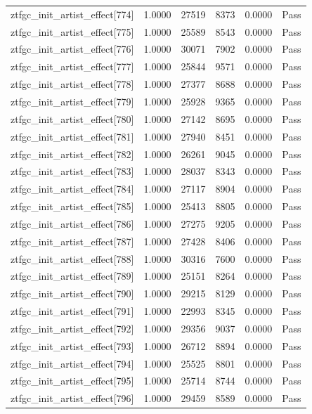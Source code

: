\begin{table}[htbp]
\begin{tabular}{llrrll}
ztfgc\_init\_artist\_effect[774] & 1.0000 & 27519 & 8373 & 0.0000 & Pass \\
ztfgc\_init\_artist\_effect[775] & 1.0000 & 25589 & 8543 & 0.0000 & Pass \\
ztfgc\_init\_artist\_effect[776] & 1.0000 & 30071 & 7902 & 0.0000 & Pass \\
ztfgc\_init\_artist\_effect[777] & 1.0000 & 25844 & 9571 & 0.0000 & Pass \\
ztfgc\_init\_artist\_effect[778] & 1.0000 & 27377 & 8688 & 0.0000 & Pass \\
ztfgc\_init\_artist\_effect[779] & 1.0000 & 25928 & 9365 & 0.0000 & Pass \\
ztfgc\_init\_artist\_effect[780] & 1.0000 & 27142 & 8695 & 0.0000 & Pass \\
ztfgc\_init\_artist\_effect[781] & 1.0000 & 27940 & 8451 & 0.0000 & Pass \\
ztfgc\_init\_artist\_effect[782] & 1.0000 & 26261 & 9045 & 0.0000 & Pass \\
ztfgc\_init\_artist\_effect[783] & 1.0000 & 28037 & 8343 & 0.0000 & Pass \\
ztfgc\_init\_artist\_effect[784] & 1.0000 & 27117 & 8904 & 0.0000 & Pass \\
ztfgc\_init\_artist\_effect[785] & 1.0000 & 25413 & 8805 & 0.0000 & Pass \\
ztfgc\_init\_artist\_effect[786] & 1.0000 & 27275 & 9205 & 0.0000 & Pass \\
ztfgc\_init\_artist\_effect[787] & 1.0000 & 27428 & 8406 & 0.0000 & Pass \\
ztfgc\_init\_artist\_effect[788] & 1.0000 & 30316 & 7600 & 0.0000 & Pass \\
ztfgc\_init\_artist\_effect[789] & 1.0000 & 25151 & 8264 & 0.0000 & Pass \\
ztfgc\_init\_artist\_effect[790] & 1.0000 & 29215 & 8129 & 0.0000 & Pass \\
ztfgc\_init\_artist\_effect[791] & 1.0000 & 22993 & 8345 & 0.0000 & Pass \\
ztfgc\_init\_artist\_effect[792] & 1.0000 & 29356 & 9037 & 0.0000 & Pass \\
ztfgc\_init\_artist\_effect[793] & 1.0000 & 26712 & 8894 & 0.0000 & Pass \\
ztfgc\_init\_artist\_effect[794] & 1.0000 & 25525 & 8801 & 0.0000 & Pass \\
ztfgc\_init\_artist\_effect[795] & 1.0000 & 25714 & 8744 & 0.0000 & Pass \\
ztfgc\_init\_artist\_effect[796] & 1.0000 & 29459 & 8589 & 0.0000 & Pass \\

\end{tabular}
\end{table}
